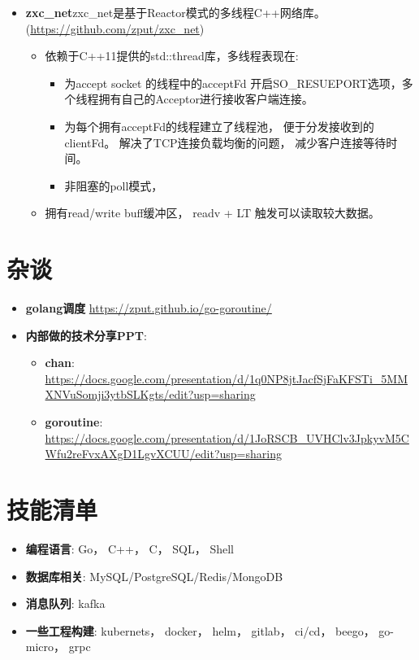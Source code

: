 \documentclass{resume}
\begin{document}
\begin{itemize}[parsep=0.2ex]
  \item \textbf{zxc\_net}zxc\_net是基于Reactor模式的多线程C++网络库。(\url{https://github.com/zput/zxc_net})
    \begin{itemize}[parsep=0.2ex]
          \item 依赖于C++11提供的std::thread库，多线程表现在:
            \begin{itemize}[parsep=0.2ex]
              \item 为accept socket 的线程中的acceptFd 开启SO\_RESUEPORT选项，多个线程拥有自己的Acceptor进行接收客户端连接。
              \item 为每个拥有acceptFd的线程建立了线程池， 便于分发接收到的clientFd。 解决了TCP连接负载均衡的问题， 减少客户连接等待时间。
              \item 非阻塞的poll模式，
            \end{itemize}
          \item 拥有read/write buff缓冲区， readv + LT 触发可以读取较大数据。
    \end{itemize}
\end{itemize}


\section{杂谈}
\begin{itemize}[parsep=0.2ex]
  \item \textbf{golang调度} \url{https://zput.github.io/go-goroutine/}
  \item \textbf{内部做的技术分享PPT}:
  \begin{itemize}[parsep=0.2ex]
    \item \textbf{chan}: \url{https://docs.google.com/presentation/d/1q0NP8jtJacfSjFaKFSTi_5MMXNVuSomji3ytbSLKgts/edit?usp=sharing}
    \item \textbf{goroutine}: \url{https://docs.google.com/presentation/d/1JoRSCB_UVHClv3JpkyvM5CWfu2reFvxAXgD1LgvXCUU/edit?usp=sharing}
  \end{itemize}
\end{itemize}

\section{技能清单}
\begin{itemize}[parsep=0.2ex]
  \item \textbf{编程语言}: Go， C++， C， SQL， Shell
  \item \textbf{数据库相关}: MySQL/PostgreSQL/Redis/MongoDB
  \item \textbf{消息队列}: kafka
  \item \textbf{一些工程构建}: kubernets， docker， helm， gitlab， ci/cd， beego， go-micro， grpc
\end{itemize}


%
%
\end{document}

